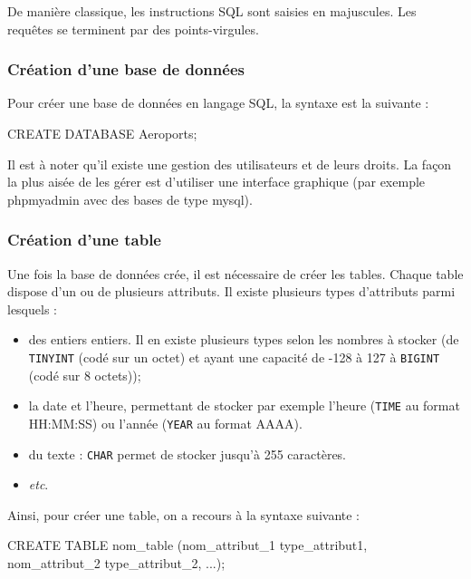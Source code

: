 \documentclass[10pt]{article}
\begin{document}
\begin{rem}
De manière classique, les instructions SQL sont saisies en majuscules. Les requêtes se terminent par des points-virgules.
\end{rem}

\subsubsection{Création d'une base de données}


\begin{envsql}
Pour créer une base de données en langage SQL, la syntaxe est la suivante :

\begin{sql}
CREATE DATABASE Aeroports;
\end{sql}
\end{envsql}

Il est à noter qu'il existe une gestion des utilisateurs et de leurs droits. La façon la plus aisée de les gérer est d'utiliser une interface graphique (par exemple phpmyadmin avec des bases de type mysql).

\subsubsection{Création d'une table}
Une fois la base de données crée, il est nécessaire de créer les tables. Chaque table dispose d'un ou de plusieurs attributs. Il existe plusieurs types d'attributs parmi lesquels : 
\begin{itemize}
 \item des entiers entiers. Il en existe plusieurs types selon les nombres à stocker (de \texttt{TINYINT} (codé sur un octet) et ayant une capacité de -128 à 127 à \texttt{BIGINT} (codé sur 8 octets));
 \item la date et l'heure, permettant de stocker par exemple l'heure (\texttt{TIME} au format HH:MM:SS) ou l'année (\texttt{YEAR} au format AAAA).
 \item du texte : \texttt{CHAR} permet de stocker jusqu'à 255 caractères.
 \item \textit{etc}.
\end{itemize}

\begin{envsql}

Ainsi, pour créer une table, on a recours à la syntaxe suivante :
\begin{sql}
CREATE TABLE nom_table (nom_attribut_1 type_attribut1, nom_attribut_2  type_attribut_2, ...);
\end{sql}
\end{envsql}
\end{document}
